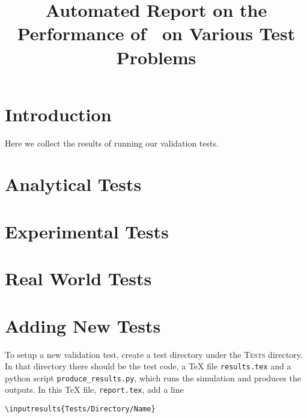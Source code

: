 \documentclass[11pt,a4paper]{report}
\begin{document}
 
\title{Automated Report on the Performance of \anuga ~on Various Test Problems}
\maketitle
\tableofcontents
\chapter{Introduction}

Here we collect the results of running our validation tests. 



\chapter{Analytical Tests}







\chapter{Experimental Tests}


\chapter{Real World Tests}


\appendix
\chapter{Adding New Tests}


To setup a new validation test, create a test directory under the
\textsc{Tests} directory. In that directory there should be the test code, a
\TeX{} file \texttt{results.tex} and a python script
\texttt{produce\_results.py}, which runs the simulation and produces the
outputs. In this \TeX{} file, \texttt{report.tex}, add a line
\begin{verbatim}
\inputresults{Tests/Directory/Name}
\end{verbatim}
\end{document}
